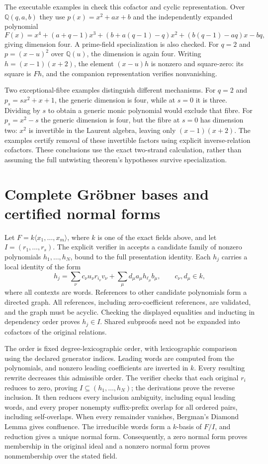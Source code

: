 \documentclass[11pt]{article}
\newcommand{\Q}{\mathbb Q}
\begin{document}
The executable examples in  check this
cofactor and cyclic representation. Over $\Q(q,a,b)$ they use
$p(x)=x^2+ax+b$ and the independently expanded polynomial
\[
 F(x)=x^4+(a+q-1)x^3+(b+a(q-1)-q)x^2
       +(b(q-1)-aq)x-bq,
\]
giving dimension four. A prime-field specialization is also checked. For
$q=2$ and $p=(x-u)^2$ over $\Q(u)$, the dimension is again four. Writing
$h=(x-1)(x+2)$, the element $(x-u)h$ is nonzero and square-zero: its square
is $Fh$, and the companion representation verifies nonvanishing.

Two exceptional-fibre examples distinguish different mechanisms. For $q=2$
and $p_s=sx^2+x+1$, the generic dimension is four, while at $s=0$ it is
three. Dividing by $s$ to obtain a generic monic polynomial would exclude
that fibre. For $p_s=x^2-s$ the generic dimension is four, but the fibre at
$s=0$ has dimension two: $x^2$ is invertible in the Laurent algebra, leaving
only $(x-1)(x+2)$. The examples certify removal of these invertible factors
using explicit inverse-relation cofactors. These conclusions use the exact
two-strand calculation, rather than assuming the full untwisting theorem's
hypotheses survive specialization.

\section{Complete Gr\"obner bases and certified normal forms}
Let $F=k\langle x_1,\ldots,x_m\rangle$, where $k$ is one of the exact fields
above, and let $I=(r_1,\ldots,r_s)$. The explicit verifier in
 accepts a candidate family of nonzero
polynomials $h_1,\ldots,h_N$, bound to the full presentation identity. Each
$h_j$ carries a local identity of the form
\[
 h_j=\sum_\nu c_\nu u_\nu r_{i_\nu}v_\nu
       +\sum_\mu d_\mu a_\mu h_{\ell_\mu}b_\mu,
 \qquad c_\nu,d_\mu\in k,
\]
where all contexts are words. References to other candidate polynomials form
a directed graph. All references, including zero-coefficient references, are
validated, and the graph must be acyclic. Checking the displayed equalities
and inducting in dependency order proves $h_j\in I$. Shared subproofs need
not be expanded into cofactors of the original relations.

The order is fixed degree-lexicographic order, with lexicographic comparison
using the declared generator indices. Leading words are computed from the
polynomials, and nonzero leading coefficients are inverted in $k$. Every
resulting rewrite decreases this admissible order. The verifier checks that
each original $r_i$ reduces to zero, proving $I\subseteq(h_1,\ldots,h_N)$;
the derivations prove the reverse inclusion. It then reduces every inclusion
ambiguity, including equal leading words, and every proper nonempty
suffix-prefix overlap for all ordered pairs, including self-overlaps.
When every remainder vanishes, Bergman's Diamond Lemma
\cite[Theorem~1.2]{bergman} gives confluence. The irreducible words form a
$k$-basis of $F/I$, and reduction gives a unique normal form. Consequently,
a zero normal form proves membership in the original ideal and a nonzero
normal form proves nonmembership over the stated field.
\end{document}
